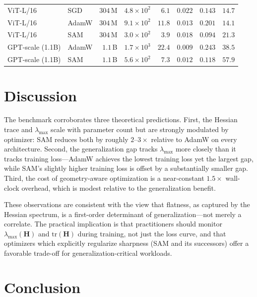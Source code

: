 \documentclass[twocolumn,10pt]{article}
\newcommand{\Hmat}{\mathbf{H}}
\begin{document}
\begin{table}[t]
\begin{tabular}{@{}llrrrrrr@{}}
\midrule
ViT-L/16           & SGD    & $304$\,M  & $4.8\times10^{2}$ & $6.1$ & $0.022$ & $0.143$ & $14.7$ \\
ViT-L/16           & AdamW  & $304$\,M  & $9.1\times10^{2}$ & $11.8$ & $0.013$ & $0.201$ & $14.1$ \\
ViT-L/16           & SAM    & $304$\,M  & $3.0\times10^{2}$ & $3.9$ & $0.018$ & $0.094$ & $21.3$ \\
\midrule
GPT-scale (1.1B)   & AdamW  & $1.1$\,B  & $1.7\times10^{3}$ & $22.4$ & $0.009$ & $0.243$ & $38.5$ \\
GPT-scale (1.1B)   & SAM    & $1.1$\,B  & $5.6\times10^{2}$ & $7.3$ & $0.012$ & $0.118$ & $57.9$ \\
\bottomrule
\end{tabular}
\end{table}

\section{Discussion}
\label{sec:discussion}

The benchmark corroborates three theoretical predictions. First, the Hessian trace and $\lambda_{\max}$ scale with parameter count but are strongly modulated by optimizer: SAM reduces both by roughly $2$--$3\times$ relative to AdamW on every architecture. Second, the generalization gap tracks $\lambda_{\max}$ more closely than it tracks training loss---AdamW achieves the lowest training loss yet the largest gap, while SAM's slightly higher training loss is offset by a substantially smaller gap. Third, the cost of geometry-aware optimization is a near-constant $1.5\times$ wall-clock overhead, which is modest relative to the generalization benefit.

These observations are consistent with the view that flatness, as captured by the Hessian spectrum, is a first-order determinant of generalization---not merely a correlate. The practical implication is that practitioners should monitor $\lambda_{\max}(\Hmat)$ and $\mathrm{tr}(\Hmat)$ during training, not just the loss curve, and that optimizers which explicitly regularize sharpness (SAM and its successors) offer a favorable trade-off for generalization-critical workloads.

\section{Conclusion}
\label{sec:conclusion}
\end{document}
